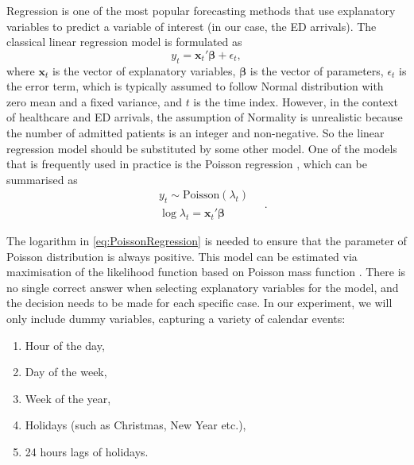 \documentclass[]{elsarticle} %
\providecommand{\tightlist}{%
  \setlength{\itemsep}{0pt}\setlength{\parskip}{0pt}}
\begin{document}
Regression is one of the most popular forecasting methods that use explanatory variables to predict a variable of interest (in our case, the ED arrivals). The classical linear regression model is formulated as
\begin{equation}
  {y}_t = \mathbf{x}_t' \boldsymbol{\beta} + \epsilon_t ,
\label{eq:linearRegression}
\end{equation}
where \(\mathbf{x}_t\) is the vector of explanatory variables, \(\boldsymbol{\beta}\) is the vector of parameters, \(\epsilon_t\) is the error term, which is typically assumed to follow Normal distribution with zero mean and a fixed variance, and \(t\) is the time index. However, in the context of healthcare and ED arrivals, the assumption of Normality is unrealistic because the number of admitted patients is an integer and non-negative. So the linear regression model should be substituted by some other model. One of the models that is frequently used in practice is the Poisson regression \citep[see, for example,][]{mccarthy2008challenge}, which can be summarised as
\begin{equation}
  \begin{aligned}
    & {y}_t \sim \mathrm{Poisson} \left( \lambda_t \right) \\
    & \log \lambda_t = \mathbf{x}_t' \boldsymbol{\beta}
  \end{aligned} \quad .
\label{eq:PoissonRegression}
\end{equation}

The logarithm in \eqref{eq:PoissonRegression} is needed to ensure that the parameter of Poisson distribution is always positive. This model can be estimated via maximisation of the likelihood function based on Poisson mass function . There is no single correct answer when selecting explanatory variables for the model, and the decision needs to be made for each specific case. In our experiment, we will only include dummy variables, capturing a variety of calendar events:

\begin{enumerate}
\def\labelenumi{\arabic{enumi}.}
\tightlist
\item
  Hour of the day,
\item
  Day of the week,
\item
  Week of the year,
\item
  Holidays (such as Christmas, New Year etc.),
\item
  24 hours lags of holidays.
\end{enumerate}
\end{document}
